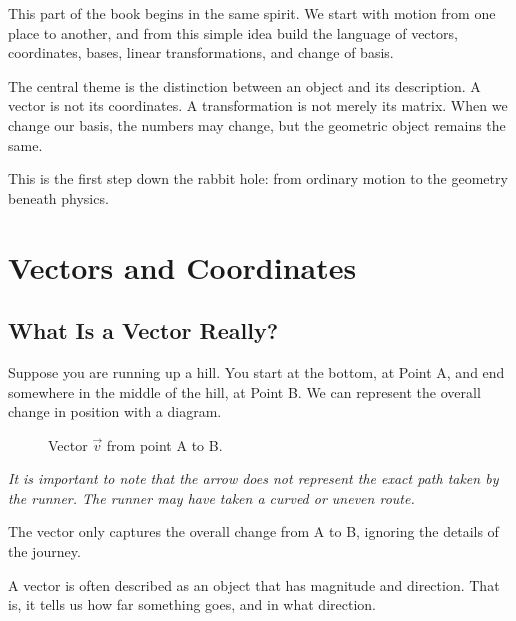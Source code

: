 \documentclass[11pt,openany]{book}
\theoremstyle{definition}
\begin{document}
\medskip

This part of the book begins in the same spirit. We start with motion from one place to 
another, and from this simple idea build the language of vectors, coordinates, bases, 
linear transformations, and change of basis.

\medskip

The central theme is the distinction between an object and its description. A vector is 
not its coordinates. A transformation is not merely its matrix. When we change our basis, 
the numbers may change, but the geometric object remains the same.

\medskip

This is the first step down the rabbit hole: from ordinary motion to the geometry beneath 
physics.


\chapter{Vectors and Coordinates}

\section{What Is a Vector Really?}

Suppose you are running up a hill. You start at the bottom, at Point A, and end somewhere in the middle of the hill, at Point B. We can represent the overall change in position with a diagram.

\begin{figure}[htbp]
\centering
{}
\caption{Vector $\vec{v}$ from point A to B.}
\label{fig:vector_diagram}
\end{figure}

\textit{It is important to note that the arrow does not represent the exact path taken by the runner. The runner may have taken a curved or uneven route. }

\medskip

The vector only captures the overall change from A to B, ignoring the details of the journey.

\medskip

A vector is often described as an object that has magnitude and direction. That is, it tells us how far something goes, and in what direction.
\end{document}

